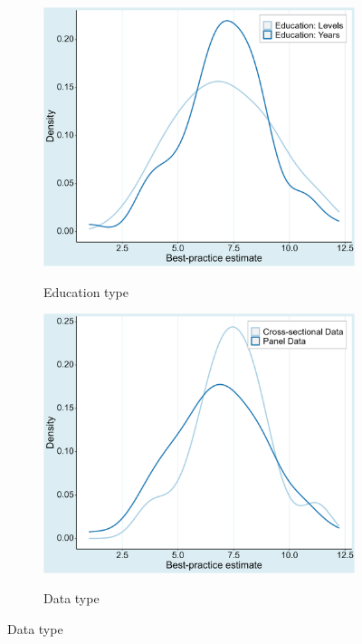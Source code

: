 \begin{figure}[!htbp]
  \begin{center}
    \caption{Implied best-practice across various subsets of data}
    \label{fig:bpe_graphs}

    \begin{subfigure}[!htbp]{0.38\textwidth}
      \vspace{-0.1cm}
      \caption{Education type}
      \vspace{-0.1cm}
      \includegraphics[width=0.95\linewidth]{Figures/BPE/bpe_years_levels.png}
      \label{fig:bpe_years_levels}
    \end{subfigure}
    \begin{subfigure}[!htbp]{0.38\textwidth}
      \vspace{-0.1cm}
      \caption{Data type}
      \vspace{-0.1cm}
      \includegraphics[width=0.95\linewidth]{Figures/BPE/bpe_data_type.png}
      \label{fig:bpe_data_type}
    \end{subfigure}


\end{center}
\end{figure}
